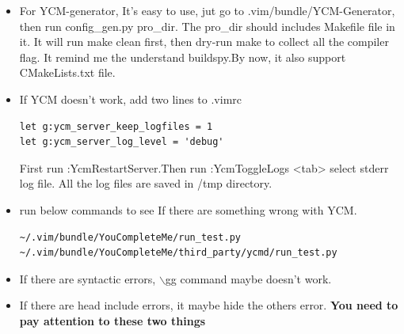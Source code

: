 \documentclass[a4paper,11pt,twoside]{book}
\begin{document}
\begin{itemize}
		\item For YCM-generator, It's easy to use, jut go to .vim/bundle/YCM-Generator, then run config\_gen.py pro\_dir. The pro\_dir should includes Makefile file in it.  It will run make clean first, then dry-run make to collect all the compiler flag. It remind me the understand buildspy.By now, it also support CMakeLists.txt file. 

		\item If YCM doesn't work, add two lines to .vimrc 
\begin{verbatim}
let g:ycm_server_keep_logfiles = 1
let g:ycm_server_log_level = 'debug'
\end{verbatim}

First run :YcmRestartServer.Then run :YcmToggleLogs <tab> select stderr log file. All the log files are saved in /tmp directory. 

\item run below commands to see If there are something wrong with YCM. 	
\begin{verbatim}
~/.vim/bundle/YouCompleteMe/run_test.py
~/.vim/bundle/YouCompleteMe/third_party/ycmd/run_test.py
\end{verbatim}
		\item If there are syntactic errors, $\backslash$gg command maybe doesn't work. 

		\item If there are head include errors, it maybe hide the others error. \textbf{You need to pay attention to these two things}

\end{itemize}
\end{document}
